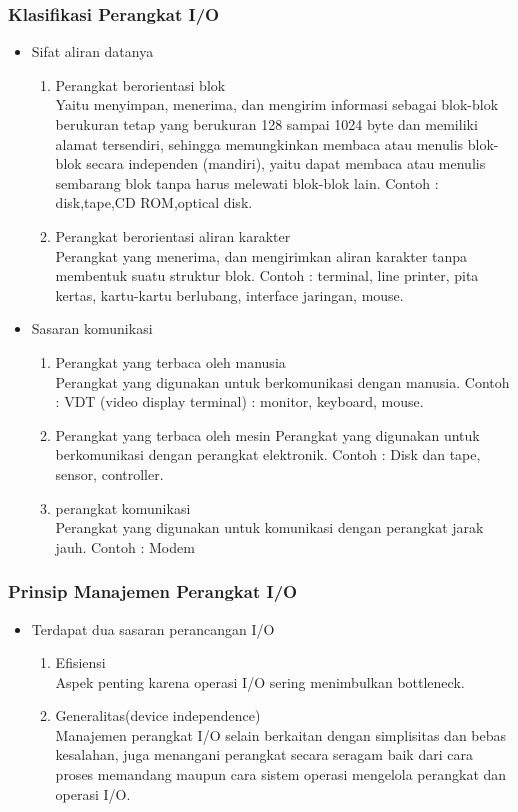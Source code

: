 \documentclass[12pt]{article}
\begin{document}
\subsubsection{Klasifikasi Perangkat I/O}
\begin{itemize}
    \item Sifat aliran datanya
\begin{enumerate}
    \item Perangkat berorientasi blok \\
    Yaitu menyimpan, menerima, dan mengirim informasi sebagai blok-blok berukuran tetap yang berukuran 128 sampai 1024 byte dan memiliki alamat tersendiri, sehingga memungkinkan membaca atau menulis blok-blok secara independen (mandiri), yaitu dapat membaca atau menulis sembarang blok tanpa harus melewati blok-blok lain. Contoh : disk,tape,CD ROM,optical disk.
    \item Perangkat berorientasi aliran karakter \\
    Perangkat yang menerima, dan mengirimkan aliran karakter tanpa membentuk suatu struktur blok. Contoh : terminal, line printer, pita kertas, kartu-kartu berlubang, interface jaringan, mouse.
\end{enumerate}
\end{itemize}
\begin{itemize}
    \item Sasaran komunikasi 
\begin{enumerate}
    \item Perangkat yang terbaca oleh manusia \\
    Perangkat yang digunakan untuk berkomunikasi dengan manusia. 
    Contoh : VDT (video display terminal) : monitor, keyboard, mouse.
    \item Perangkat yang terbaca oleh mesin 
    Perangkat yang digunakan untuk berkomunikasi dengan perangkat elektronik. Contoh : Disk dan tape, sensor, controller.
    \item perangkat komunikasi\\
    Perangkat yang digunakan untuk komunikasi dengan perangkat jarak jauh. Contoh : Modem
\end{enumerate}
\end{itemize}
\subsubsection{Prinsip Manajemen Perangkat I/O}
\begin{itemize}
    \item Terdapat dua sasaran perancangan I/O
\begin{enumerate}
    \item Efisiensi \\
    Aspek penting karena operasi I/O sering menimbulkan bottleneck.
    \item Generalitas(device independence) \\
    Manajemen perangkat I/O selain berkaitan dengan simplisitas dan bebas kesalahan, juga menangani perangkat secara seragam baik dari cara proses memandang maupun cara sistem operasi mengelola perangkat dan operasi I/O.
\end{enumerate}
\end{itemize}
\end{document}
